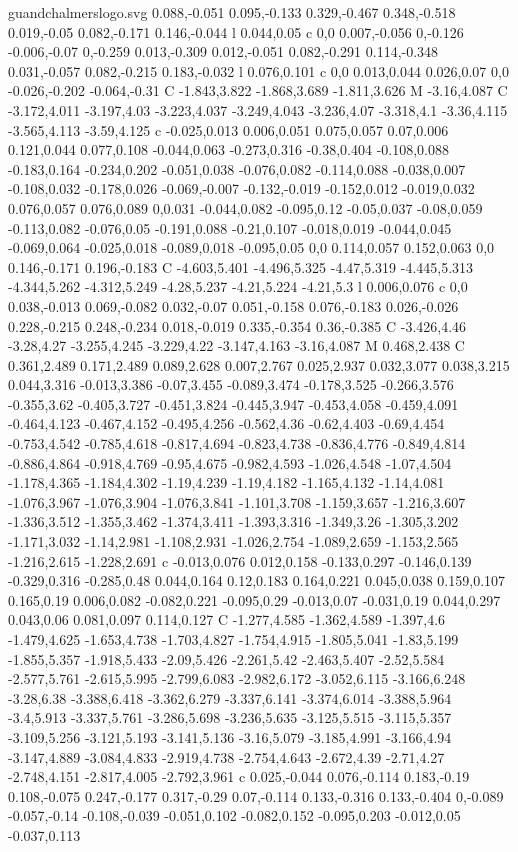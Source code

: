\begin{filecontents}[noheader]{guandchalmerslogo.svg}
0.088,-0.051 0.095,-0.133 0.329,-0.467 0.348,-0.518 0.019,-0.05 0.082,-0.171 0.146,-0.044 l 0.044,0.05 c 0,0 0.007,-0.056 0,-0.126 -0.006,-0.07 0,-0.259 0.013,-0.309 0.012,-0.051 0.082,-0.291 0.114,-0.348 0.031,-0.057 0.082,-0.215 0.183,-0.032 l 0.076,0.101 c 0,0 0.013,0.044 0.026,0.07 0,0 -0.026,-0.202 -0.064,-0.31 C -1.843,3.822 -1.868,3.689 -1.811,3.626 M -3.16,4.087 C -3.172,4.011 -3.197,4.03 -3.223,4.037 -3.249,4.043 -3.236,4.07 -3.318,4.1 -3.36,4.115 -3.565,4.113 -3.59,4.125 c -0.025,0.013 0.006,0.051 0.075,0.057 0.07,0.006 0.121,0.044 0.077,0.108 -0.044,0.063 -0.273,0.316 -0.38,0.404 -0.108,0.088 -0.183,0.164 -0.234,0.202 -0.051,0.038 -0.076,0.082 -0.114,0.088 -0.038,0.007 -0.108,0.032 -0.178,0.026 -0.069,-0.007 -0.132,-0.019 -0.152,0.012 -0.019,0.032 0.076,0.057 0.076,0.089 0,0.031 -0.044,0.082 -0.095,0.12 -0.05,0.037 -0.08,0.059 -0.113,0.082 -0.076,0.05 -0.191,0.088 -0.21,0.107 -0.018,0.019 -0.044,0.045 -0.069,0.064 -0.025,0.018 -0.089,0.018 -0.095,0.05 0,0 0.114,0.057 0.152,0.063 0,0 0.146,-0.171 0.196,-0.183 C -4.603,5.401 -4.496,5.325 -4.47,5.319 -4.445,5.313 -4.344,5.262 -4.312,5.249 -4.28,5.237 -4.21,5.224 -4.21,5.3 l 0.006,0.076 c 0,0 0.038,-0.013 0.069,-0.082 0.032,-0.07 0.051,-0.158 0.076,-0.183 0.026,-0.026 0.228,-0.215 0.248,-0.234 0.018,-0.019 0.335,-0.354 0.36,-0.385 C -3.426,4.46 -3.28,4.27 -3.255,4.245 -3.229,4.22 -3.147,4.163 -3.16,4.087 M 0.468,2.438 C 0.361,2.489 0.171,2.489 0.089,2.628 0.007,2.767 0.025,2.937 0.032,3.077 0.038,3.215 0.044,3.316 -0.013,3.386 -0.07,3.455 -0.089,3.474 -0.178,3.525 -0.266,3.576 -0.355,3.62 -0.405,3.727 -0.451,3.824 -0.445,3.947 -0.453,4.058 -0.459,4.091 -0.464,4.123 -0.467,4.152 -0.495,4.256 -0.562,4.36 -0.62,4.403 -0.69,4.454 -0.753,4.542 -0.785,4.618 -0.817,4.694 -0.823,4.738 -0.836,4.776 -0.849,4.814 -0.886,4.864 -0.918,4.769 -0.95,4.675 -0.982,4.593 -1.026,4.548 -1.07,4.504 -1.178,4.365 -1.184,4.302 -1.19,4.239 -1.19,4.182 -1.165,4.132 -1.14,4.081 -1.076,3.967 -1.076,3.904 -1.076,3.841 -1.101,3.708 -1.159,3.657 -1.216,3.607 -1.336,3.512 -1.355,3.462 -1.374,3.411 -1.393,3.316 -1.349,3.26 -1.305,3.202 -1.171,3.032 -1.14,2.981 -1.108,2.931 -1.026,2.754 -1.089,2.659 -1.153,2.565 -1.216,2.615 -1.228,2.691 c -0.013,0.076 0.012,0.158 -0.133,0.297 -0.146,0.139 -0.329,0.316 -0.285,0.48 0.044,0.164 0.12,0.183 0.164,0.221 0.045,0.038 0.159,0.107 0.165,0.19 0.006,0.082 -0.082,0.221 -0.095,0.29 -0.013,0.07 -0.031,0.19 0.044,0.297 0.043,0.06 0.081,0.097 0.114,0.127 C -1.277,4.585 -1.362,4.589 -1.397,4.6 -1.479,4.625 -1.653,4.738 -1.703,4.827 -1.754,4.915 -1.805,5.041 -1.83,5.199 -1.855,5.357 -1.918,5.433 -2.09,5.426 -2.261,5.42 -2.463,5.407 -2.52,5.584 -2.577,5.761 -2.615,5.995 -2.799,6.083 -2.982,6.172 -3.052,6.115 -3.166,6.248 -3.28,6.38 -3.388,6.418 -3.362,6.279 -3.337,6.141 -3.374,6.014 -3.388,5.964 -3.4,5.913 -3.337,5.761 -3.286,5.698 -3.236,5.635 -3.125,5.515 -3.115,5.357 -3.109,5.256 -3.121,5.193 -3.141,5.136 -3.16,5.079 -3.185,4.991 -3.166,4.94 -3.147,4.889 -3.084,4.833 -2.919,4.738 -2.754,4.643 -2.672,4.39 -2.71,4.27 -2.748,4.151 -2.817,4.005 -2.792,3.961 c 0.025,-0.044 0.076,-0.114 0.183,-0.19 0.108,-0.075 0.247,-0.177 0.317,-0.29 0.07,-0.114 0.133,-0.316 0.133,-0.404 0,-0.089 -0.057,-0.14 -0.108,-0.039 -0.051,0.102 -0.082,0.152 -0.095,0.203 -0.012,0.05 -0.037,0.113 
\end{filecontents}
